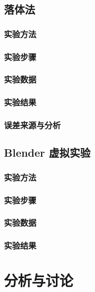 \documentclass[12pt,hyperref,a4paper,UTF8]{ctexart}
\begin{document}
\subsection{落体法}
\subsubsection{实验方法}

\subsubsection{实验步骤}

\subsubsection{实验数据}

\subsubsection{实验结果}

\subsubsection{误差来源与分析}

\subsection{Blender 虚拟实验}
\subsubsection{实验方法}

\subsubsection{实验步骤}

\subsubsection{实验数据}

\subsubsection{实验结果}


\section{分析与讨论}
\end{document}
